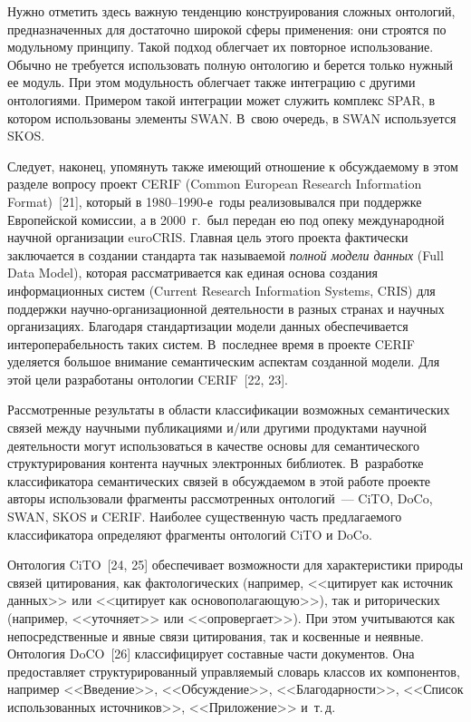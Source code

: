 \begin{multicols}{2}
  Нужно отметить здесь важную тенденцию конструирования сложных 
онтологий, предназначенных для достаточно широкой сферы применения: они 
строятся по модульному принципу. Такой подход облегчает их повторное 
использование. Обыч\-но не требуется 
использовать полную онтологию и берется только нужный ее модуль. При этом 
модульность облегчает также интеграцию с другими онтологиями. Примером 
такой интеграции может служить комплекс {SPAR}, в котором 
использованы элементы {SWAN}. В~свою очередь, в {SWAN} 
используется {SKOS}. 
  
  Следует, наконец, упомянуть также имеющий отношение к обсуждаемому в 
этом разделе вопросу проект CERIF (Common European Research Information Format)~[21], 
который в 1980--1990-е~годы 
реализовывался при поддержке Европейской комиссии, а в 2000~г.\ был 
передан ею под опеку международной научной организации {euroCRIS}. 
Главная цель этого проекта фактически заключается в создании стандарта так 
называемой \textit{полной модели данных} ({Full Data Model}), которая 
рассматривается как единая основа создания информационных сис\-тем 
({Current Research Information Systems}, {CRIS}) для поддержки 
  на\-уч\-но-ор\-га\-ни\-за\-ци\-он\-ной деятельности в разных странах и 
научных организациях. Благодаря стандартизации модели данных 
обеспечивается интероперабельность таких систем. В~последнее время в 
проекте {CERIF} уделяется большое внимание семантическим аспектам 
созданной модели. Для этой цели разработаны онтологии 
{CERIF}~[22, 23].
  
  Рассмотренные результаты в области классификации возможных 
семантических связей между научными публикациями и/или другими 
продуктами научной деятельности могут использоваться в качестве основы для 
семантического структурирования контента научных электронных библиотек. 
В~разработке классификатора семантических связей в обсуждаемом в этой 
работе проекте авторы использовали фрагменты рассмотренных онтологий~--- 
{CiTO}, {DoCo}, {SWAN}, {SKOS} и {CERIF}. 
Наиболее существенную часть предлагаемого классификатора определяют 
фрагменты онтологий {CiTO} и {DoCo}. 
  
  Онтология {CiTO}~[24, 25] 
обеспечивает возможности для характеристики природы связей цитирования, 
как фактологических (например, <<цитирует как источник данных>> или 
<<цитирует как основополагающую>>), так и риторических (например, 
<<уточняет>> или <<опровергает>>). При этом учитываются как 
непосредственные и явные связи цитирования, так и косвенные и неявные. 
Онтология {DoCO}~[26] 
классифицирует составные части документов. Она предоставляет 
структурированный управляемый словарь классов их компонентов, например 
<<Введение>>, <<Обсуждение>>, <<Благодарности>>, <<Список 
использованных источников>>, <<Приложение>> и~т.\,д.
  

\end{multicols}
